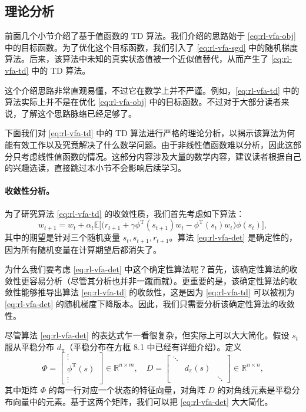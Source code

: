 \subsection{理论分析}
\label{sec:rl-vfa-theory}

前面几个小节介绍了基于值函数的 TD 算法。我们介绍的思路始于 \cref{eq:rl-vfa-obj} 中的目标函数。为了优化这个目标函数，我们引入了 \cref{eq:rl-vfa-sgd} 中的随机梯度算法。后来，该算法中未知的真实状态值被一个近似值替代，从而产生了 \cref{eq:rl-vfa-td} 中的 TD 算法。

这个介绍思路非常直观易懂，不过它在数学上并不严谨。例如，\cref{eq:rl-vfa-td} 中的算法实际上并不是在优化 \cref{eq:rl-vfa-obj} 中的目标函数。不过对于大部分读者来说，了解这个思路脉络已经足够了。

下面我们对 \cref{eq:rl-vfa-td} 中的 TD 算法进行严格的理论分析，以揭示该算法为何能有效工作以及究竟解决了什么数学问题。由于非线性值函数难以分析，因此这部分只考虑线性值函数的情况。这部分内容涉及大量的数学内容，建议读者根据自己的兴趣选读，直接跳过本小节不会影响后续学习。

\paragraph{收敛性分析。}为了研究算法 \cref{eq:rl-vfa-td} 的收敛性质，我们首先考虑如下算法：
\begin{equation}
w_{t+1} = w_{t} + \alpha_{t} \mathbb{E}\Big[\big(r_{t+1} + \gamma \phi^{\mathrm{T}}(s_{t+1}) w_{t} - \phi^{\mathrm{T}}(s_{t}) w_{t}\big) \phi(s_{t})\Big],
\label{eq:rl-vfa-det}
\end{equation}
其中的期望是针对三个随机变量 $s_t, s_{t+1}, r_{t+1}$。算法 \cref{eq:rl-vfa-det} 是确定性的，因为所有随机变量在计算期望后都消失了。

为什么我们要考虑 \cref{eq:rl-vfa-det} 中这个确定性算法呢？首先，该确定性算法的收敛性更容易分析（尽管其分析也并非一蹴而就）。更重要的是，该确定性算法的收敛性能够推导出算法 \cref{eq:rl-vfa-td} 的收敛性，这是因为 \cref{eq:rl-vfa-td} 可以被视为 \cref{eq:rl-vfa-det} 的随机梯度下降版本。因此，我们只需要分析该确定性算法的收敛性。

尽管算法 \cref{eq:rl-vfa-det} 的表达式乍一看很复杂，但实际上可以大大简化。假设 $s_t$ 服从平稳分布 $d_\pi$（平稳分布在方框 8.1 中已经有详细介绍）。定义
\begin{equation}
\Phi = \left[\begin{array}{c} \vdots \\ \phi^{\mathrm{T}}(s) \\ \vdots \end{array}\right] \in \mathbb{R}^{n \times m}, \quad D = \left[\begin{array}{ccc} \ddots & & \\ & d_{\pi}(s) & \\ & & \ddots \end{array}\right] \in \mathbb{R}^{n \times n},
\label{eq:rl-vfa-PhiD}
\end{equation}
其中矩阵 $\Phi$ 的每一行对应一个状态的特征向量，对角阵 $D$ 的对角线元素是平稳分布向量中的元素。基于这两个矩阵，我们可以把 \cref{eq:rl-vfa-det} 大大简化。

